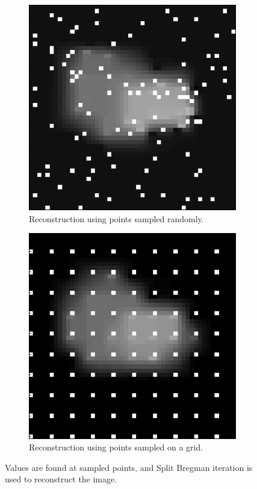 \documentclass[english]{article}\usepackage[]{graphicx}\usepackage[]{color}
\begin{document}
\begin{figure}[h]
\centering
\begin{subfigure}{.3\textwidth}
  \centering
    \includegraphics[width=1\linewidth]{figures/randompointreconstruction}
  \caption{Reconstruction using points sampled randomly.}
  \label{fig:randrec}
\end{subfigure}%
\hspace{30pt}
\begin{subfigure}{.3\textwidth}
  \centering
    \includegraphics[width=1\linewidth]{figures/gridpointreconstruction}
  \caption{Reconstruction using points sampled on a grid.}
  \label{fig:gridrec}
\end{subfigure}
\caption{Values are found at sampled points, and Split Bregman iteration is used to reconstruct the image.}
\label{fig:samplerec}
\end{figure}
\end{document}
